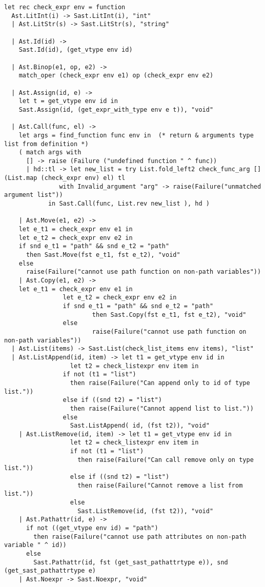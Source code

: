 \documentclass[11pt]{article}
\begin{document}
\begin{listing}[H]
  \begin{verbatim}
let rec check_expr env = function
  Ast.LitInt(i) -> Sast.LitInt(i), "int"
  | Ast.LitStr(s) -> Sast.LitStr(s), "string"

  | Ast.Id(id) ->
    Sast.Id(id), (get_vtype env id)

  | Ast.Binop(e1, op, e2) ->
    match_oper (check_expr env e1) op (check_expr env e2)

  | Ast.Assign(id, e) ->
    let t = get_vtype env id in
    Sast.Assign(id, (get_expr_with_type env e t)), "void"

  | Ast.Call(func, el) ->
    let args = find_function func env in  (* return & arguments type list from definition *)
    ( match args with
      [] -> raise (Failure ("undefined function " ^ func))
      | hd::tl -> let new_list = try List.fold_left2 check_func_arg [] (List.map (check_expr env) el) tl
               with Invalid_argument "arg" -> raise(Failure("unmatched argument list"))
            in Sast.Call(func, List.rev new_list ), hd )

    | Ast.Move(e1, e2) ->
    let e_t1 = check_expr env e1 in
    let e_t2 = check_expr env e2 in
    if snd e_t1 = "path" && snd e_t2 = "path"
      then Sast.Move(fst e_t1, fst e_t2), "void"
    else
      raise(Failure("cannot use path function on non-path variables"))
    | Ast.Copy(e1, e2) ->
    let e_t1 = check_expr env e1 in
                let e_t2 = check_expr env e2 in
                if snd e_t1 = "path" && snd e_t2 = "path"
                        then Sast.Copy(fst e_t1, fst e_t2), "void"
                else
                        raise(Failure("cannot use path function on non-path variables"))
  | Ast.List(items) -> Sast.List(check_list_items env items), "list"
  | Ast.ListAppend(id, item) -> let t1 = get_vtype env id in
                  let t2 = check_listexpr env item in
                if not (t1 = "list")
                  then raise(Failure("Can append only to id of type list."))
                else if ((snd t2) = "list")
                  then raise(Failure("Cannot append list to list."))
                else
                  Sast.ListAppend( id, (fst t2)), "void"
    | Ast.ListRemove(id, item) -> let t1 = get_vtype env id in
                  let t2 = check_listexpr env item in
                  if not (t1 = "list")
                    then raise(Failure("Can call remove only on type list."))
                  else if ((snd t2) = "list")
                    then raise(Failure("Cannot remove a list from list."))
                  else
                    Sast.ListRemove(id, (fst t2)), "void"
    | Ast.Pathattr(id, e) ->
      if not ((get_vtype env id) = "path")
        then raise(Failure("cannot use path attributes on non-path variable " ^ id))
      else
        Sast.Pathattr(id, fst (get_sast_pathattrtype e)), snd (get_sast_pathattrtype e)
    | Ast.Noexpr -> Sast.Noexpr, "void"


\end{verbatim}
\end{listing}
\end{document}
